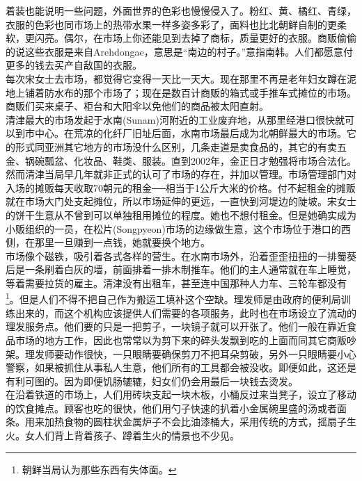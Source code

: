 \begin{multicols}{\theparacolNo}
着装也能说明一些问题，外面世界的色彩也慢慢侵入了。粉红、黄、橘红、青绿，衣服的色彩也同市场上的热带水果一样多姿多彩了，面料也比北朝鲜自制的更柔软，更闪亮。偶尔，在市场上你还能见到去掉了商标，质量更好的衣服。商贩偷偷的说这些衣服是来自Arehdongae，意思是“南边的村子。”意指南韩。人们都愿意付更多的钱去买产自敌国的衣服。\\

每次宋女士去市场，都觉得它变得一天比一天大。现在那里不再是老年妇女蹲在泥地上铺着防水布的那个市场了；现在是数百计商贩的箱式或手推车式摊位的市场。商贩们买来桌子、柜台和大阳伞以免他们的商品被太阳直射。\\

清津最大的市场发起于水南(Sunam)河附近的工业废弃地，从那里经港口很快就可以到市中心。在荒凉的化纤厂旧址后面，水南市场最后成为北朝鲜最大的市场。它的形式同亚洲其它地方的市场没什么区别，几条走道是卖食品的，其它的有卖五金、锅碗瓢盆、化妆品、鞋类、服装。直到2002年，金正日才勉强将市场合法化。然而清津当局早几年就非正式的认可了市场的存在，并加以管理。市场管理部门对入场的摊贩每天收取70朝元的租金──相当于1公斤大米的价格。付不起租金的摊贩就在市场大门处支起摊位，所以市场延伸的更远，一直快到河堤边的陡坡。宋女士的饼干生意从不曾到可以单独租用摊位的程度。她也不想付租金。但是她确实成为小贩组织的一员，在松片(Songpyeon)市场的边缘做生意，这个市场位于港口的西侧，在那里一旦赚到一点钱，她就要换个地方。\\

市场像个磁铁，吸引着各式各样的营生。在水南市场外，沿着歪歪扭扭的一排蜀葵后是一条刷着白灰的墙，前面排着一排木制推车。他们的主人通常就在车上睡觉，等着需要拉货的雇主。清津没有出租车，甚至连中国那种人力车、三轮车都没有\footnote{朝鲜当局认为那些东西有失体面。}。但是人们不得不把自己作为搬运工填补这个空缺。理发师是由政府的便利局训练出来的，而这个机构应该提供人们需要的各项服务，此时也在市场设立了流动的理发服务点。他们要的只是一把剪子，一块镜子就可以开张了。他们一般在靠近食品市场的地方工作，因此也常常以为剪下来的碎头发飘到吃的上面而同其它商贩吵架。理发师要动作很快，一只眼睛要确保剪刀不把耳朵剪破，另外一只眼睛要小心警察，如果被抓住从事私人生意，他们所有的工具都会被没收。即便如此，这还是有利可图的。因为即便饥肠辘辘，妇女们仍会用最后一块钱去烫发。\\

在沿着铁道的市场上，人们用砖块支起一块木板，小桶反过来当凳子，设立了移动的饮食摊点。顾客也吃的很快，他们用勺子快速的扒着小金属碗里盛的汤或者面条。用来加热食物的圆柱状金属炉子不会比油漆桶大，采用传统的方式，摇扇子生火。女人们背上背着孩子、蹲着生火的情景也不少见。\\


\end{multicols}

